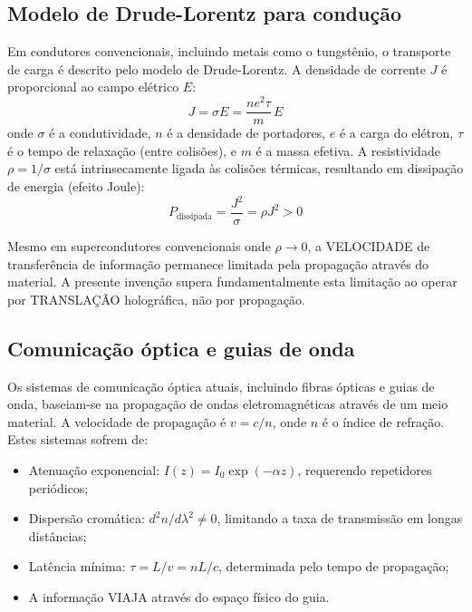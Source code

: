 \documentclass[12pt,a4paper]{article}
\begin{document}
\subsection{Modelo de Drude-Lorentz para condução}

Em condutores convencionais, incluindo metais como o tungstênio,
o transporte de carga é descrito pelo modelo de Drude-Lorentz.
A densidade de corrente $J$ é proporcional ao campo elétrico $E$:
\begin{equation}
J = \sigma E = \frac{ne^2\tau}{m}\,E
\label{eq:drude}
\end{equation}
onde $\sigma$ é a condutividade, $n$ é a densidade de
portadores, $e$ é a carga do elétron, $\tau$ é o tempo de
relaxação (entre colisões), e $m$ é a massa efetiva. A
resistividade $\rho = 1/\sigma$ está intrinsecamente ligada
às colisões térmicas, resultando em dissipação de energia
(efeito Joule):
\begin{equation}
P_{\text{dissipada}} = \frac{J^2}{\sigma} = \rho J^2 > 0
\label{eq:joule}
\end{equation}

Mesmo em supercondutores convencionais onde $\rho \to 0$, a
VELOCIDADE de transferência de informação permanece limitada
pela propagação através do material. A presente invenção supera
fundamentalmente esta limitação ao operar por TRANSLAÇÃO
holográfica, não por propagação.

\subsection{Comunicação óptica e guias de onda}

Os sistemas de comunicação óptica atuais, incluindo fibras
ópticas e guias de onda, baseiam-se na propagação de ondas
eletromagnéticas através de um meio material. A velocidade de
propagação é $v = c/n$, onde $n$ é o índice de refração. Estes
sistemas sofrem de:

\begin{itemize}[nosep]
\item Atenuação exponencial: $I(z) = I_0 \exp(-\alpha z)$,
  requerendo repetidores periódicos;
\item Dispersão cromática: $d^2n/d\lambda^2 \neq 0$, limitando
  a taxa de transmissão em longas distâncias;
\item Latência mínima: $\tau = L/v = nL/c$, determinada pelo
  tempo de propagação;
\item A informação VIAJA através do espaço físico do guia.
\end{itemize}
\end{document}
